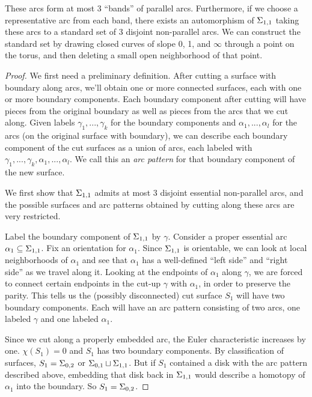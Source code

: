 \begin{lemma}\label{L:ex1.1}

These arcs form at most 3 ``bands'' of parallel arcs. Furthermore, if we choose
a representative arc from each band, there exists an automorphism of
$\Sigma_{1,1}$ taking these arcs to a standard set of 3 disjoint non-parallel
arcs. We can construct the standard set by drawing closed curves of slope 0, 1,
and $\infty$ through a point on the torus, and then deleting a small open
neighborhood of that point.

\end{lemma}
\begin{proof}

We first need a preliminary definition. After cutting a surface with boundary
along arcs, we'll obtain one or more connected surfaces, each with one or more
boundary components. Each boundary component after cutting will have pieces
from the original boundary as well as pieces from the arcs that we cut along.
Given labels $\gamma_1,...,\gamma_k$ for the boundary components and
$\alpha_1,...,\alpha_l$ for the arcs (on the original surface with boundary),
we can describe each boundary component of the cut surfaces as a union of arcs,
each labeled with $\gamma_1,...,\gamma_k,\alpha_1,...,\alpha_l$. We call this
an \emph{arc pattern} for that boundary component of the new surface.

We first show that $\Sigma_{1,1}$ admits at most 3 disjoint essential non-parallel
arcs, and the possible surfaces and arc patterns obtained by cutting along
these arcs are very restricted.

Label the boundary component of $\Sigma_{1,1}$ by $\gamma$. Consider a proper
essential arc $\alpha_1 \subseteq \Sigma_{1,1}$. Fix an orientation for $\alpha_1$.
Since $\Sigma_{1,1}$ is orientable, we can look at local neighborhoods of
$\alpha_1$ and see that $\alpha_1$ has a well-defined ``left side'' and ``right
side'' as we travel along it. Looking at the endpoints of $\alpha_1$ along
$\gamma$, we are forced to connect certain endpoints in the cut-up $\gamma$
with $\alpha_1$, in order to preserve the parity. This tells us the (possibly
disconnected) cut surface $S_1$ will have two boundary components. Each will
have an arc pattern consisting of two arcs, one labeled $\gamma$ and one
labeled $\alpha_1$.

Since we cut along a properly embedded arc, the Euler characteristic increases
by one. $\chi(S_1)=0$ and $S_1$ has two boundary components. By classification
of surfaces, $S_1 = \Sigma_{0,2}$ or $\Sigma_{0,1} \sqcup \Sigma_{1,1}$. But if $S_1$
contained a disk with the arc pattern described above, embedding that disk back
in $\Sigma_{1,1}$ would describe a homotopy of $\alpha_1$ into the boundary. So
$S_1 = \Sigma_{0,2}$.


\end{proof}
